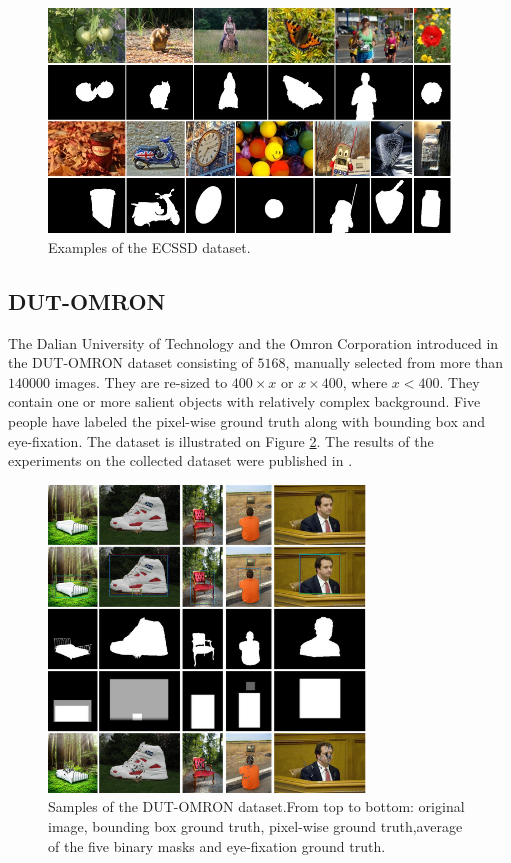 \begin{figure}[h]
\begin{center}
\includegraphics[width=0.95\textwidth]{fig/ECSSD}
\end{center}
\caption{Examples of the ECSSD dataset.}
\label{fig:ecssd}
\end{figure}

\subsection{DUT-OMRON}
The Dalian University of Technology and the Omron Corporation introduced in the DUT-OMRON dataset \cite{dut-omron_db} consisting of $5168$, manually selected from more than $140 000$ images. They are re-sized to $400 \times x$ or $x \times 400$, where  $x < 400$. They contain one or more salient objects with relatively complex background. Five people have labeled the pixel-wise ground truth along with bounding box and eye-fixation. The dataset is illustrated on Figure \ref{fig:dut-omron}. The results of the experiments on the collected dataset were published in \cite{yang2013saliency}.

\begin{figure}[h]
\begin{center}
\includegraphics[width=0.75\textwidth]{fig/DUT-OMRON}
\end{center}
\caption{Samples of the DUT-OMRON dataset.From top to bottom: original image, bounding box ground truth, pixel-wise ground truth,average of the five binary masks and eye-fixation ground truth. }
\label{fig:dut-omron}
\end{figure}


